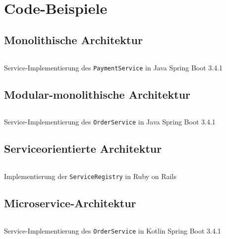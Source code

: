 \documentclass[acmtog]{acmart}
\begin{document}



\appendix

\section{Code-Beispiele}

\subsection{Monolithische Architektur}
\label{app:code:monolithic:paymentservice}
\begin{listing}[H]
  \tiny
  \inputminted[linenos=true]{java}{code/monolithic/PaymentService.java}
  \caption{Service-Implementierung des \texttt{PaymentService} in Java Spring Boot 3.4.1}
\end{listing}

\subsection{Modular-monolithische Architektur}
\label{app:code:modular:orderservice}
\begin{listing}[H]
  \tiny
  \inputminted[linenos=true]{java}{code/modulithic/OrderServiceImpl.java}
  \caption{Service-Implementierung des \texttt{OrderService} in Java Spring Boot 3.4.1}
\end{listing}

\subsection{Serviceorientierte Architektur}
\label{app:code:soa:registry}
\begin{listing}[H]
  \tiny
  \inputminted[linenos=true]{ruby}{code/soa/service_registry.rb}
  \caption{Implementierung der \texttt{ServiceRegistry} in Ruby on Rails}
\end{listing}

\subsection{Microservice-Architektur}
\label{app:code:microservices:orderservice}
\begin{listing}[H]
  \tiny
  \inputminted[linenos=true]{kotlin}{code/microservices/OrderServiceImpl.kt}
  \caption{Service-Implementierung des \texttt{OrderService} in Kotlin Spring Boot 3.4.1}
\end{listing}
\end{document}
